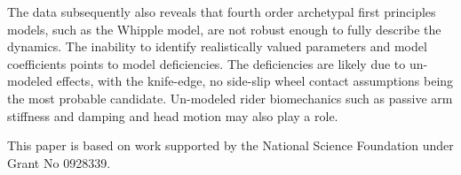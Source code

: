 \documentclass{article}
\begin{document}
The data subsequently also reveals that fourth order archetypal first
principles models, such as the Whipple model, are not robust enough to fully
describe the dynamics. The inability to identify realistically valued
parameters and model coefficients points to model deficiencies. The
deficiencies are likely due to un-modeled effects, with the knife-edge, no
side-slip wheel contact assumptions being the most probable candidate.
Un-modeled rider biomechanics such as passive arm stiffness and damping and
head motion may also play a role.

This paper is based on work supported by the National Science Foundation under
Grant No 0928339.
\end{document}
